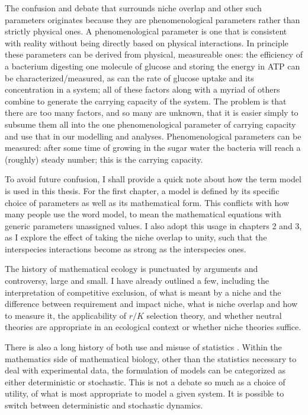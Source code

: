 The confusion and debate that surrounds niche overlap and other such parameters originates because they are phenomenological parameters rather than strictly physical ones. 
A phenomenological parameter is one that is consistent with reality without being directly based on physical interactions. 
In principle these parameters can be derived from physical, measureable ones: the efficiency of a bacterium digesting one molecule of glucose and storing the energy in ATP can be characterized/measured, as can the rate of glucose uptake and its concentration in a system; all of these factors along with a myriad of others combine to generate the carrying capacity of the system. 
The problem is that there are too many factors, and so many are unknown, that it is easier simply to subsume them all into the one phenomenological parameter of carrying capacity and use that in our modelling and analyses. 
Phenomenological parameters can be measured: after some time of growing in the sugar water the bacteria will reach a (roughly) steady number; this is the carrying capacity. 

To avoid future confusion, I shall provide a quick note about how the term model is used in this thesis. 
For the first chapter, a model is defined by its specific choice of parameters as well as its mathematical form. %
This conflicts with how many people use the word model, to mean the mathematical equations with generic parameters unassigned values. 
I also adopt this usage in chapters 2 and 3, as I explore the effect of taking the niche overlap to unity, such that the interspecies interactions become as strong as the interspecies ones. %

The history of mathematical ecology is punctuated by arguments and controversy, large and small. %
I have already outlined a few, including the interpretation of competitive exclusion, of what is meant by a niche and the difference between requirement and impact niche, what is niche overlap and how to measure it, the applicability of $r/K$ selection theory, and whether neutral theories are appropriate in an ecological context or whether niche theories suffice. 
\iffalse
competitive exclusion
niche vs neutral
requirement vs impact niche
niche overlap and how to measure
r/K selection
and also the use (and misuse) of stats
deterministic vs stochastic - more a utility than a debate
\fi
There is also a long history of both use and misuse of statistics \cite{May2004}. 
Within the mathematics side of mathematical biology, other than the statistics necessary to deal with experimental data, the formulation of models can be categorized as either deterministic or stochastic. 
This is not a debate so much as a choice of utility, of what is most appropriate to model a given system. 
It is possible to switch between deterministic and stochastic dynamics. 

